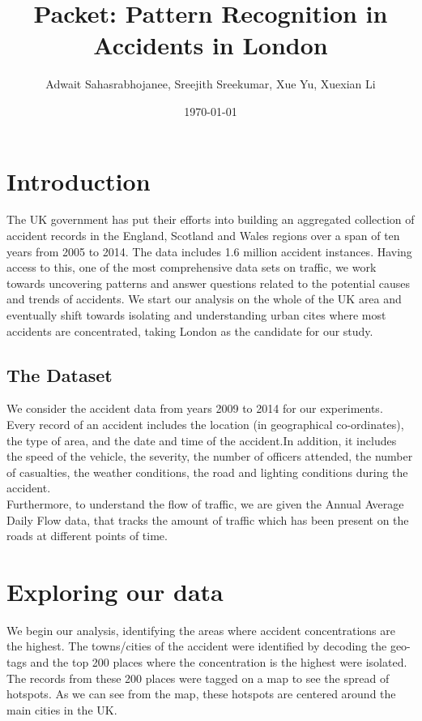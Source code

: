 \documentclass{neu_handout}
\title{Packet: Pattern Recognition in Accidents in London}
\author{Adwait Sahasrabhojanee, Sreejith Sreekumar, Xue Yu, Xuexian Li}
\date{\today}
\begin{document}
\section{Introduction}
The UK government has put their efforts into building an aggregated collection of accident records in the England, Scotland and Wales regions
over a span of ten years from 2005 to 2014. The data includes 1.6 million accident instances. Having access to this, one of the most comprehensive data sets on traffic, we work towards
uncovering patterns and answer questions related to the potential causes and trends of accidents. We start our analysis on the whole of the UK area and eventually shift towards
isolating and understanding urban cites where most accidents are concentrated, taking London as the candidate for our study.

\subsection{The Dataset}
We consider the accident data from years 2009 to 2014 for our experiments. Every record of an accident includes the location (in geographical co-ordinates), the type of area, and the date and time of the accident.In addition, it includes the speed of the vehicle, the severity, the number of officers attended, the number of casualties, the weather conditions, the road and lighting conditions during the accident. \\

Furthermore, to understand the flow of traffic, we are given the Annual Average Daily Flow data, that tracks the amount of traffic which has been present on the roads at different points of time. \\

\section{Exploring our data}
We begin our analysis, identifying the areas where accident concentrations are the highest. The towns/cities of the accident were identified by decoding the geo-tags and the top 200 places where the concentration is the highest were isolated. The records from these 200 places were tagged on a map to see the spread of hotspots. As we can see from the map, these hotspots are centered around the main cities in the UK.
\end{document}

